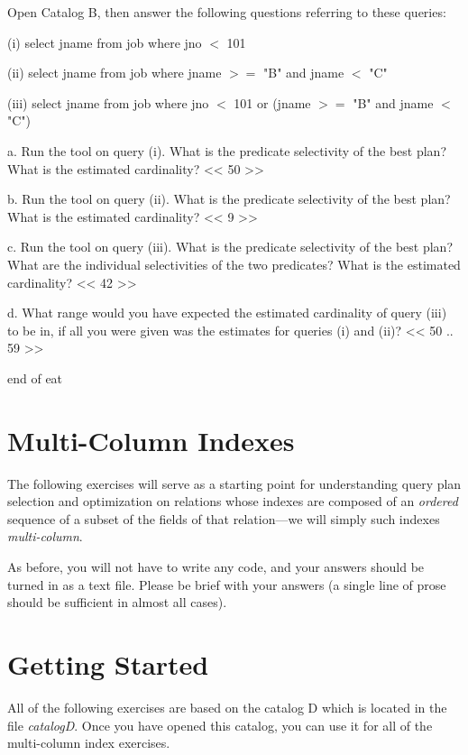 \begin{enumerate}
{%

   Open Catalog B, then answer the following questions referring to these
   queries:

    (i)   select jname from job
          where jno $<$ 101

    (ii)  select jname from job
          where jname $>=$ "B" and jname $<$ "C"

    (iii) select jname from job
          where jno $<$ 101 or (jname $>=$ "B" and jname $<$ "C")


   a. Run the tool on query (i).  What is the predicate selectivity of the best
      plan?  What is the estimated cardinality?
<< 50 >>

   b. Run the tool on query (ii).  What is the predicate selectivity of the
      best plan?  What is the estimated cardinality?
<< 9 >>

   c. Run the tool on query (iii).  What is the predicate selectivity of the
      best plan?  What are the individual selectivities of the two predicates?
      What is the estimated cardinality?
<< 42 >>

   d. What range would you have expected the estimated cardinality of query
      (iii) to be in, if all you were given was the estimates for queries (i)
      and (ii)?
<< 50 .. 59 >>

end of eat
}

\end{enumerate}

\section{Multi-Column Indexes}

The following exercises will serve as a starting point for understanding
query plan selection and optimization on relations whose indexes are
composed of an {\em ordered} sequence of a subset of the fields of that
relation---we will simply such indexes {\em multi-column}.

As before, you will not have to write any code, and your answers should
be turned in as a text file.  Please be brief with your answers (a single
line of prose should be sufficient in almost all cases).


\section{Getting Started}

All of the following exercises are based on the catalog D which is located
in the file {\em catalogD}.  Once you have opened this catalog, you can
use it for all of the multi-column index exercises.

